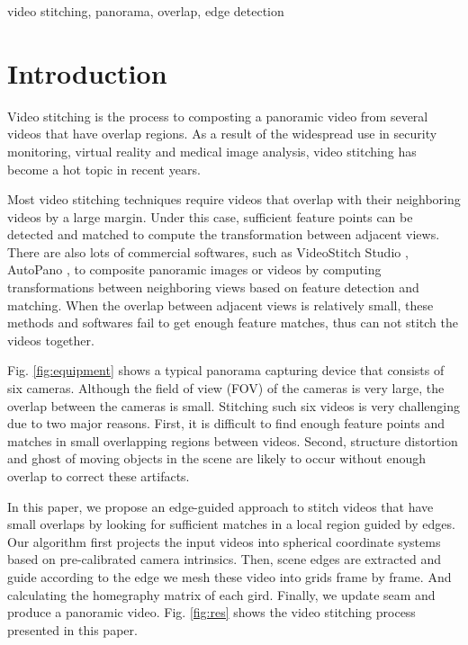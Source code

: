 \documentclass[conference]{IEEEtran}
\begin{document}
\begin{IEEEkeywords}
video stitching, panorama, overlap, edge detection
\end{IEEEkeywords}

\section{Introduction}
\label{sec:intro}

Video stitching is the process to composting a panoramic video from several videos that have overlap regions. %
As a result of the widespread
use in security monitoring, virtual reality and medical image
analysis, video stitching has become a hot topic in recent years.

Most video stitching techniques \cite{zheng2008stitching, guo2016joint, Jiang_2015_CVPR_Workshops, nie2018dynamic} require videos that overlap with
their neighboring videos by a large margin.
Under this case, sufficient feature points can be detected and matched to compute the transformation between adjacent views.
There are also lots of commercial softwares, such as VideoStitch Studio \cite{videostitching}, AutoPano \cite{autopano}, to composite panoramic images or videos by computing transformations between neighboring views based on feature detection and matching.
When the overlap between adjacent views is relatively small, these methods and softwares fail to get enough feature matches, thus can not stitch the videos together.

Fig. \ref{fig:equipment} shows a typical panorama capturing device that consists of six cameras. 
Although the field of view (FOV) of the cameras is very large, the overlap between the cameras is small. 
Stitching such six videos is very challenging due to two
major reasons. First, it is difficult to find enough feature points and matches in small overlapping regions between videos. Second, structure distortion and ghost of moving objects in the scene are likely to occur without enough overlap to correct these artifacts. 

In this paper, we propose an edge-guided approach to stitch videos that have small overlaps by looking for sufficient matches in a local region guided by edges. 
%
Our algorithm first projects the input videos into spherical coordinate systems based on pre-calibrated camera intrinsics. 
Then, scene edges are extracted and guide according to the edge we mesh these video into grids frame by frame.
And calculating the homegraphy matrix of each gird. Finally, we update seam and produce a panoramic video.
Fig. \ref{fig:res} shows the video stitching process presented in this paper.
\end{document}
